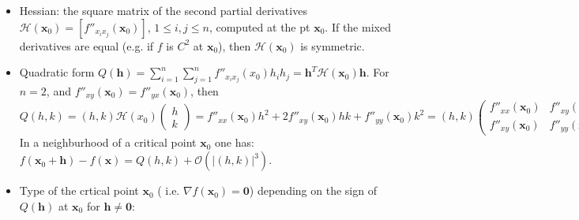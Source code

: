 \documentclass{article}
\newcommand{\Tr}[2]{#1}
\newcommand\Ordo{\mathcal O}
\newcommand\bdh{\mathbf h}
\newcommand\bdx{\mathbf x}
\newcommand\bdzero{\mathbf 0}
\begin{document}
\begin{itemize}

  \item %
    \Tr{Hessian: the square matrix of the second partial derivatives}
       {Hessianen: matrisen av de andra partiella derivatorna}
    $\mathcal{H}(\bdx_0)=[f''_{x_ix_j}(\bdx_0)]$, $1\le i,j\le n$,
    \Tr{computed at the pt}
       {beräknade i}
    $\bdx_0$.
    \Tr{If the mixed derivatives are equal (e.g. if}
       {Ifall de blandade derivatorna är lika (t\,ex om}
    $f$
    \Tr{is}
       {är}
    $C^2$
    \Tr{at}
       {i}
    $\bdx_0$),
    \Tr{then}
       {då är}
    $\mathcal{H}(\bdx_0)$
    \Tr{is symmetric.}
       {symmetrisk.}

  \item %
    \Tr{Quadratic form}
       {Kvadratisk form}
    $Q(\bdh)=\sum_{i=1}^n\sum_{j=1}^n f''_{x_ix_j}(x_0)h_ih_j =\bdh^T\mathcal H(\bdx_0)\bdh$.
    \Tr{For}
       {För}
    $n=2$,
    \Tr{and}
       {och}
    $f''_{xy}(\bdx_0)=f''_{yx}(\bdx_0)$,
    \Tr{then}
       {är}
    $$
    Q(h,k)
    = (h,k) \mathcal H(x_0)\!\begin{pmatrix}h\\k\end{pmatrix}
    = f''_{xx}(\bdx_0)h^2+2f''_{xy}(\bdx_0)hk+f''_{yy}(\bdx_0)k^2
    = (h,k)\begin{pmatrix}
      f''_{xx}(\bdx_0) & f''_{xy}(\bdx_0)\\
      f''_{xy}(\bdx_0) & f''_{yy}(\bdx_0)
    \end{pmatrix}
    \!
    \begin{pmatrix}h\\k\end{pmatrix}.
    $$
    \Tr{In a neighburhood of a critical point}
       {I en omgivning av den kritiska punkten}
    $\bdx_0$
    \Tr{one has:}
       {är}
    $f(\bdx_0+\bdh)-f(\bdx)=Q(h,k)+\Ordo(|(h,k)|^3)$.

  \item %
    \Tr{Type of the crtical  point}
       {Typ av den kritiska punkten}
$\bdx_0$ (%
\Tr{i.e.}
   {dvs}
$\nabla f(\bdx_0)=\bdzero$)
\Tr{depending on the sign of}
   {beroende på tecknet av}
     $Q(\bdh)$
     \Tr{at}
        {i}
     $\bdx_0$
     \Tr{for}
        {för}
     $\bdh\neq\bdzero$:


\end{itemize}
\end{document}
